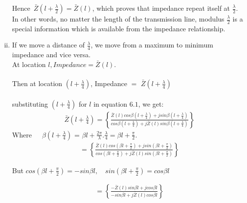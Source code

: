 \begin{enumerate}[(i)]
Hence\ $\bar{Z}(l+\frac{\lambda}{2})
=\bar{Z}(l)$, which proves that impedance repeat itself at $\frac{\lambda}{2}$.\\

In other words, no matter the length of the transmission line, modulus $\frac{\lambda}{2}$ is  a special information which is available from the impedance relationship.
\item If we move a distance of $\frac{\lambda}{4}$, we move from a maximum to minimum impedance and vice versa.\\

At location $l , Impedance =\bar{Z}(l).$\\\\
Then at location ${(l+\frac{\lambda}{4})}$, Impedance  $=$ $\bar{Z}(l+\frac{\lambda}{4})$\\\\
substituting ${(l+\frac{\lambda}{4})}$ for $l$ in equation $6.1$, we get:
\begin{align*}
\bar{Z}(l+\frac{\lambda}{4}) = \left\lbrace \frac{\bar{Z}(l)cos\beta (l+\frac{\lambda}{4}) + jsin\beta (l+\frac{\lambda}{4})}{cos\beta (l+\frac{\lambda}{4}) + j\bar{Z}(l)sin\beta (l+\frac{\lambda}{4})}\right\rbrace 
\end{align*}
Where\ \ \  $\beta( l + \frac{\lambda}{4})$ = $\beta l + \frac{2\pi}{\lambda} . \frac{\lambda}{4} = \beta l + \frac{\pi}{2}.$
\begin{align*} 
= \left\lbrace \frac{\bar{Z}(l)cos(\beta l + \frac{\pi}{2}) + jsin(\beta l + \frac{\pi}{2})}{cos (\beta l + \frac{\pi}{2}) + j\bar{Z}(l)sin(\beta l + \frac{\pi}{2})}\right\rbrace
\end{align*}

But $cos(\beta l + \frac{\pi}{2})= -sin\beta l , \quad sin(\beta l +\frac{\pi}{2})= cos\beta l$

\begin{align*} 
= \left\lbrace \frac{-\bar{Z}(l)sin\beta l + jcos\beta l}{-sin\beta l + j\bar{Z}(l) cos\beta l}\right\rbrace
\end{align*}


\end{enumerate}
